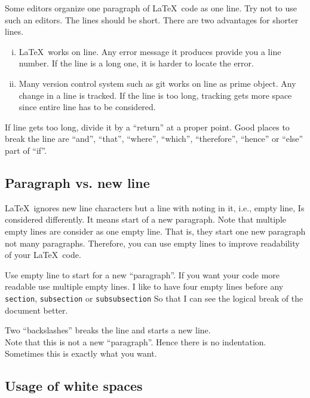 \documentclass[10pt,journal,compsoc]{IEEEtran}
\newcommand{\hCode}[1]{\texttt{#1}}
\theoremstyle{plain}
\theoremstyle{definition}
\theoremstyle{remark}
\begin{document}
Some editors organize one paragraph of \LaTeX\ code as one line.
Try not to use such an editors.
The lines should be short.
There are two advantages for shorter lines.
\begin{enumerate}[i.]

	\item
	\LaTeX\ works on line.
	Any error message it produces provide you a line number. 
	If the line is a long one,
	it is harder to locate the error.

	\item
	Many version control system such as git works on line as prime object.
	Any change in a line is tracked.
	If the line is too long,
	tracking gets more space since entire line has to be considered.

\end{enumerate}
If line gets too long,
divide it by a ``return'' at a proper point.
Good places to break the line are 
``and'', ``that'', ``where'', ``which'', ``therefore'', ``hence''  or ``else'' part of ``if''. 




\subsection{Paragraph vs. new line}

\LaTeX\ ignores new line characters but a line with noting in it, 
i.e., empty line,
Is considered differently.
It means start of a new paragraph.
Note that multiple empty lines are consider as one empty line.
That is, they start one new paragraph not many paragraphs.
Therefore, 
you can use empty lines to improve readability of your \LaTeX\ code.

Use empty line to start for a new ``paragraph''.
If you want your code more readable use multiple empty lines. 
I like to have four empty lines before any 
\hCode{section}, 
\hCode{subsection} or 
\hCode{subsubsection}
So that I can see the logical break of the document better.

Two ``backslashes'' breaks the line and starts a new line.\\
Note that this is not a new ``paragraph''.
Hence there is no indentation.
Sometimes this is exactly what you want.



\subsection{Usage of white spaces}
\end{document}
